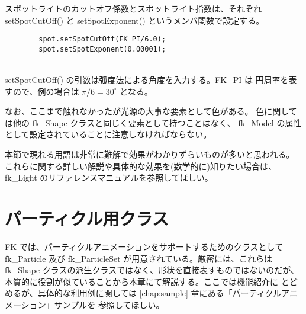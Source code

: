スポットライトのカットオフ係数とスポットライト指数は、それぞれ
setSpotCutOff() と setSpotExponent() というメンバ関数で設定する。
\\
\begin{screen}
\begin{verbatim}
        spot.setSpotCutOff(FK_PI/6.0);
        spot.setSpotExponent(0.00001);
\end{verbatim}
\end{screen}
~ \\
setSpotCutOff() の引数は弧度法による角度を入力する。FK\_PI は
円周率を表すので、例の場合は \(\pi/6 = 30^{\circ}\) となる。

なお、ここまで触れなかったが光源の大事な要素として色がある。
色に関しては他の fk\_Shape クラスと同じく要素として持つことはなく、
fk\_Model の属性として設定されていることに注意しなければならない。

本節で現れる用語は非常に難解で効果がわかりずらいものが多いと思われる。
これらに関する詳しい解説や具体的な効果を(数学的に)知りたい場合は、
fk\_Light のリファレンスマニュアルを参照してほしい。

\section{パーティクル用クラス} \label{sec:particle}
FK では、パーティクルアニメーションをサポートするためのクラスとして
fk\_Particle 及び fk\_ParticleSet が用意されている。厳密には、これらは
fk\_Shape クラスの派生クラスではなく、形状を直接表すものではないのだが、
本質的に役割が似ていることから本章にて解説する。ここでは機能紹介に
とどめるが、具体的な利用例に関しては
\ref{chap:sample} 章にある「パーティクルアニメーション」サンプルを
参照してほしい。

